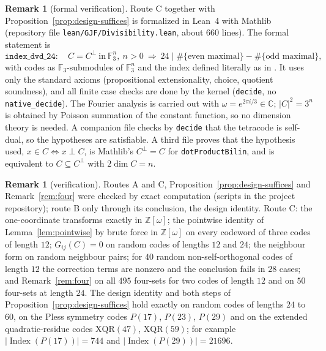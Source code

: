 \documentclass[11pt]{amsart}
\theoremstyle{definition}
\newtheorem{remark}[theorem]{Remark}
\newcommand{\F}{\mathbb{F}_3}
\newcommand{\Z}{\mathbb{Z}}
\newcommand{\Index}{\operatorname{Index}}
\begin{document}
\begin{remark}[formal verification]\label{rem:lean}
Route C together with Proposition~\ref{prop:design-suffices} is formalized in Lean~4 with Mathlib
(repository file \texttt{lean/GJF/Divisibility.lean}, about $660$ lines). The formal statement is
\[
  \texttt{index\_dvd\_24}:\quad C=C^\perp\ \text{in}\ \F^n,\ n>0\ \Longrightarrow\ 24\mid
  \#\{\text{even maximal}\}-\#\{\text{odd maximal}\},
\]
with codes as $\F$-submodules of $\F^n$ and the index defined literally as in \cite{GJF}. It uses
only the standard axioms (propositional extensionality, choice, quotient soundness), and all finite
case checks are done by the kernel (\texttt{decide}, no \texttt{native\_decide}). The Fourier
analysis is carried out with $\omega=e^{2\pi i/3}\in\mathbb C$; $|C|^2=3^n$ is obtained by Poisson
summation of the constant function, so no dimension theory is needed. A companion file checks by
\texttt{decide} that the tetracode is self-dual, so the hypotheses are satisfiable. A third file
proves that the hypothesis used, $x\in C\iff x\perp C$, is Mathlib's $C^\perp=C$ for
\texttt{dotProductBilin}, and is equivalent to $C\subseteq C^\perp$ with $2\dim C=n$.
\end{remark}

\begin{remark}[verification]
Routes A and C, Proposition~\ref{prop:design-suffices} and Remark~\ref{rem:four} were checked by
exact computation (scripts in the project repository); route B only through its conclusion, the
design identity. Route C:
the one-coordinate transforms exactly in $\Z[\omega]$; the pointwise identity of
Lemma~\ref{lem:pointwise} by brute force in $\Z[\omega]$ on every codeword of three codes of length
$12$; $G_{ij}(C)=0$ on random codes of lengths $12$ and $24$; the neighbour form on random neighbour
pairs; for $40$ random non-self-orthogonal codes of length $12$ the correction terms are nonzero
and the conclusion fails in $28$ cases; and Remark~\ref{rem:four} on all $495$ four-sets for two
codes of length $12$ and on $50$ four-sets at length $24$. The design identity and both steps of
Proposition~\ref{prop:design-suffices} hold exactly on random codes of lengths $24$ to $60$, on the
Pless symmetry codes $P(17)$, $P(23)$, $P(29)$ and on the extended quadratic-residue codes
$\mathrm{XQR}(47)$, $\mathrm{XQR}(59)$; for example $|\Index(P(17))|=744$ and
$|\Index(P(29))|=21696$.
\end{remark}
\end{document}
